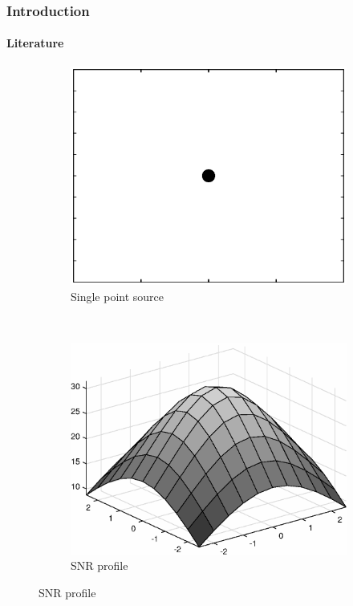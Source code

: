 \documentclass[slidestop,usepdftitle=false]{gvvslides}
\begin{document}
\begin{frame}
\frametitle{Introduction}
\framesubtitle{Literature}
\begin{figure}[t!]
    \centering
    \begin{subfigure}[t]{0.4\columnwidth}
        \centering
        \includegraphics[width=\columnwidth]{point_source}
        \caption{Single point source}
\label{fig3:subfig1}        
    \end{subfigure}%
    ~ 
    \begin{subfigure}[t]{0.4\columnwidth}
        \centering
        \includegraphics[width=\columnwidth]{pointNoPowerDist_new}
        \caption{SNR profile}
\label{fig3:subfig2}
    \end{subfigure}
    \label{fig3}
  \end{figure}

\end{frame}
  
\end{document}
